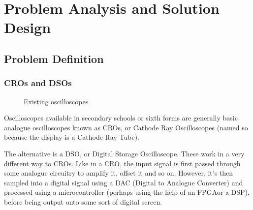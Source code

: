 \chapter{Problem Analysis and Solution Design}
\section{Problem Definition}
\subsection*{CROs and DSOs}

\begin{figure}[h]
  \centering
  \hfill
  \caption[Existing oscilloscopes]{Existing oscilloscopes\autocite{CROPhoto,DSOPhoto}}
\end{figure}

Oscilloscopes available in secondary schools or sixth forms are generally basic
analogue oscilloscopes known as CROs, or Cathode Ray Oscilloscopes (named so
because the display is a Cathode Ray Tube).~\autocite{DoctronicsScopes}

The alternative is a DSO, or Digital Storage Oscilloscope. These work in a very
different way to CROs. Like in a CRO, the input signal is first passed through
some analogue circuitry to amplify it, offset it and so on. However, it's then sampled
into a digital signal using a DAC (Digital to Analogue Converter) and processed
using a microcontroller (perhaps using the help of an FPGA\fdeffpga or a
DSP), before
being output onto some sort of digital screen.~\autocite{TiePieScopes}

